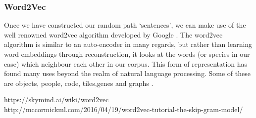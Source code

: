 \subsubsection{Word2Vec}
Once we have constructed our random path `sentences', we can make use of the well renowned word2vec algorithm developed by Google \cite{w2v}. The word2vec algorithm is similar to an auto-encoder in many regards, but rather than learning word embeddings through reconstruction, it looks at the words (or species in our case) which neighbour each other in our corpus. This form of representation has found many uses beyond the realm of natural language processing. Some of these are objects, people, code, tiles,genes and graphs \cite{objects,people,code,tile,gene,graph2vec}.



https://skymind.ai/wiki/word2vec
http://mccormickml.com/2016/04/19/word2vec-tutorial-the-skip-gram-model/
